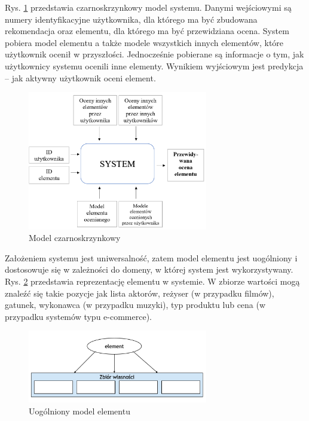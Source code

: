 \documentclass[twoside]{iisthesis}
\begin{document}
	Rys. \ref{fig:blackbox} przedstawia czarnoskrzynkowy model systemu. Danymi wejściowymi są numery identyfikacyjne użytkownika, dla którego ma być zbudowana rekomendacja oraz elementu, dla którego ma być przewidziana ocena. System pobiera model elementu a także modele wszystkich innych elementów, które użytkownik ocenił w przyszłości. Jednocześnie pobierane są informacje o tym, jak użytkownicy systemu ocenili inne elementy. Wynikiem wyjściowym jest predykcja -- jak aktywny użytkownik oceni element.
	
	\begin{figure}[!ht] 
		\centering
		\includegraphics[width=0.7\textwidth]{blackbox}
		\caption{Model czarnoskrzynkowy}
		\label{fig:blackbox}
	\end{figure}
	
	Założeniem systemu jest uniwersalność, zatem model elementu jest uogólniony i dostosowuje się w zależności do domeny, w której system jest wykorzystywany. Rys. \ref{fig:modelElementu} przedstawia reprezentację elementu w systemie. W zbiorze wartości mogą znaleźć się takie pozycje jak lista aktorów, reżyser (w przypadku filmów), gatunek, wykonawca (w przypadku muzyki), typ produktu lub cena (w przypadku systemów typu e-commerce).
	
	\begin{figure}[!ht] 
		\centering
		\includegraphics[width=0.7\textwidth]{modelElementu}
		\caption{Uogólniony model elementu}
		\label{fig:modelElementu}
	\end{figure}
	
\end{document}
